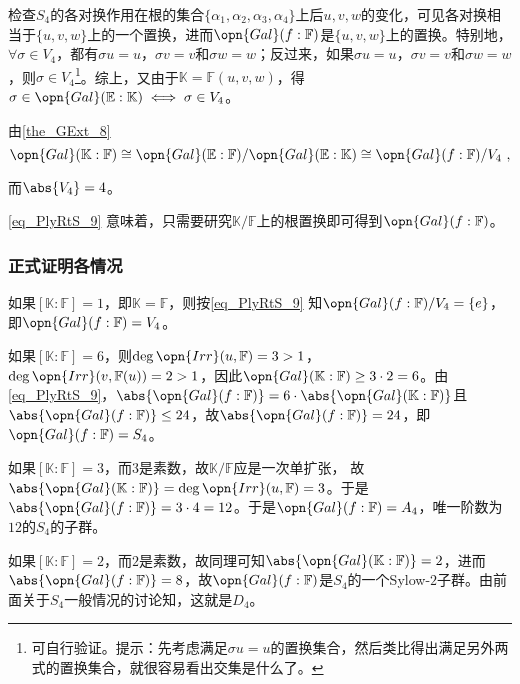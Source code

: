 检查$S_4$的各对换作用在根的集合$\{\alpha_1, \alpha_2, \alpha_3, \alpha_4\}$上后$u, v, w$的变化，可见各对换相当于$\{u, v, w\}$上的一个置换，进而$\opn{Gal}(f:\mathbb{F})$是$\{u, v, w\}$上的置换。特别地，$\forall \sigma\in V_4$，都有$\sigma u=u$，$\sigma v=v$和$\sigma w=w$；反过来，如果$\sigma u=u$，$\sigma v=v$和$\sigma w=w$，则$\sigma\in V_4$\footnote{可自行验证。提示：先考虑满足$\sigma u=u$的置换集合，然后类比得出满足另外两式的置换集合，就很容易看出交集是什么了。}。综上，又由于$\mathbb{K}=\mathbb{F}(u, v, w)$，得$\sigma\in\opn{Gal}(\mathbb{E}:\mathbb{K}) \iff \sigma\in V_4$。

由\autoref{the_GExt_8} 
\begin{equation}\label{eq_PlyRtS_9}
\opn{Gal}(\mathbb{K}:\mathbb{F})\cong \opn{Gal}(\mathbb{E}:\mathbb{F})/\opn{Gal}(\mathbb{E}:\mathbb{K})\cong \opn{Gal}(f:\mathbb{F})/V_4~,
\end{equation}

而$\abs{V_4}=4$。

\autoref{eq_PlyRtS_9} 意味着，只需要研究$\mathbb{K}/\mathbb{F}$上的根置换即可得到$\opn{Gal}(f:\mathbb{F})$。

\subsubsection{正式证明各情况}

如果$[\mathbb{K}:\mathbb{F}]=1$，即$\mathbb{K}=\mathbb{F}$，则按\autoref{eq_PlyRtS_9} 知$\opn{Gal}(f:\mathbb{F})/V_4=\{e\}$，即$\opn{Gal}(f:\mathbb{F})=V_4$。

如果$[\mathbb{K}:\mathbb{F}]=6$，则$\deg\opn{Irr}(u, \mathbb{F})=3>1$，$\deg\opn{Irr}(v, \mathbb{F}(u))=2>1$，因此$\opn{Gal}(\mathbb{K}:\mathbb{F})\geq 3\cdot 2 =6$。由\autoref{eq_PlyRtS_9}，$\abs{\opn{Gal}(f:\mathbb{F})}=6\cdot\abs{\opn{Gal}(\mathbb{K}:\mathbb{F})}$且$\abs{\opn{Gal}(f:\mathbb{F})}\leq 24$，故$\abs{\opn{Gal}(f:\mathbb{F})}=24$，即$\opn{Gal}(f:\mathbb{F})=S_4$。

如果$[\mathbb{K}:\mathbb{F}]=3$，而$3$是素数，故$\mathbb{K}/\mathbb{F}$应是一次单扩张，%
故$\abs{\opn{Gal}(\mathbb{K}:\mathbb{F})}=\deg\opn{Irr}(u, \mathbb{F})=3$。于是$\abs{\opn{Gal}(f:\mathbb{F})}=3\cdot 4=12$。于是$\opn{Gal}(f:\mathbb{F})=A_4$，唯一阶数为$12$的$S_4$的子群。

如果$[\mathbb{K}:\mathbb{F}]=2$，而$2$是素数，故同理可知$\abs{\opn{Gal}(\mathbb{K}:\mathbb{F})}=2$，进而$\abs{\opn{Gal}(f:\mathbb{F})}=8$，故$\opn{Gal}(f:\mathbb{F})$是$S_4$的一个Sylow-$2$子群。由前面关于$S_4$一般情况的讨论知，这就是$D_4$。







